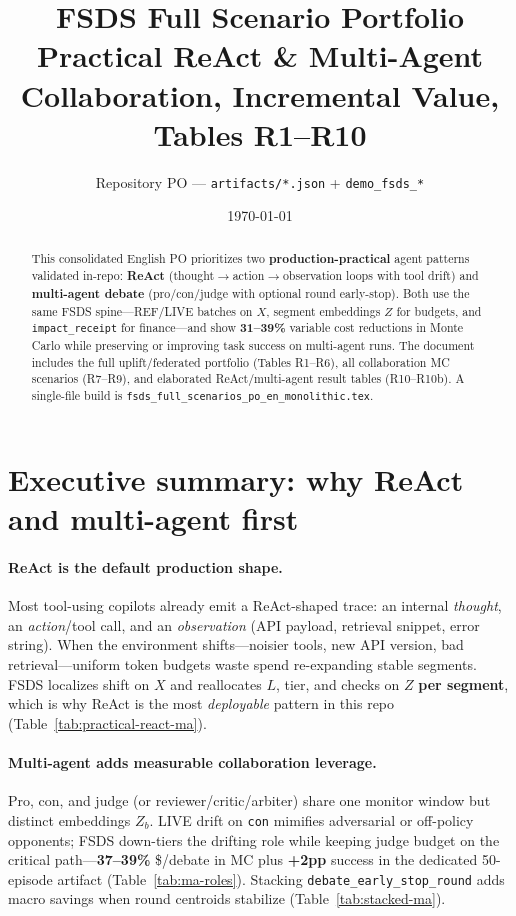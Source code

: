 \documentclass[11pt]{article}
\title{\textbf{FSDS Full Scenario Portfolio}\\[0.35em]
\large Practical ReAct \& Multi-Agent Collaboration, Incremental Value, Tables R1--R10}
\author{Repository PO --- \texttt{artifacts/*.json} + \texttt{demo\_fsds\_*}}
\date{\today}
\begin{document}
\maketitle

\begin{abstract}
This consolidated English PO prioritizes two \textbf{production-practical} agent patterns validated in-repo: \textbf{ReAct} (thought$\rightarrow$action$\rightarrow$observation loops with tool drift) and \textbf{multi-agent debate} (pro/con/judge with optional round early-stop).
Both use the same FSDS spine---REF/LIVE batches on $X$, segment embeddings $Z$ for budgets, and \texttt{impact\_receipt} for finance---and show \textbf{31--39\%} variable cost reductions in Monte Carlo while preserving or improving task success on multi-agent runs.
The document includes the full uplift/federated portfolio (Tables R1--R6), all collaboration MC scenarios (R7--R9), and elaborated ReAct/multi-agent result tables (R10--R10b).
A single-file build is \texttt{fsds\_full\_scenarios\_po\_en\_monolithic.tex}.
\end{abstract}

\tableofcontents

\section{Executive summary: why ReAct and multi-agent first}

\paragraph{ReAct is the default production shape.}
Most tool-using copilots already emit a ReAct-shaped trace: an internal \emph{thought}, an \emph{action}/tool call, and an \emph{observation} (API payload, retrieval snippet, error string).
When the environment shifts---noisier tools, new API version, bad retrieval---uniform token budgets waste spend re-expanding stable segments.
FSDS localizes shift on $X$ and reallocates $L$, tier, and checks on $Z$ \textbf{per segment}, which is why ReAct is the most \emph{deployable} pattern in this repo (Table~\ref{tab:practical-react-ma}).

\paragraph{Multi-agent adds measurable collaboration leverage.}
Pro, con, and judge (or reviewer/critic/arbiter) share one monitor window but distinct embeddings $Z_b$.
LIVE drift on \texttt{con} mimifies adversarial or off-policy opponents; FSDS down-tiers the drifting role while keeping judge budget on the critical path---\textbf{37--39\%} \$/debate in MC plus \textbf{+2pp} success in the dedicated 50-episode artifact (Table~\ref{tab:ma-roles}).
Stacking \texttt{debate\_early\_stop\_round} adds macro savings when round centroids stabilize (Table~\ref{tab:stacked-ma}).
\end{document}
